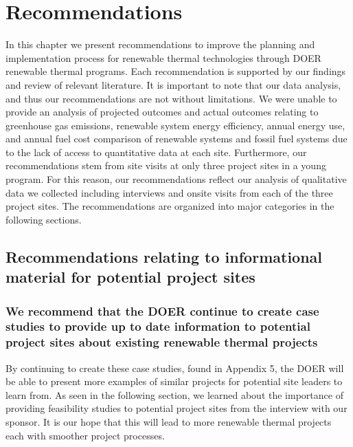 
\chapter{Recommendations}
\par In this chapter we present recommendations to improve the planning and implementation process for renewable thermal technologies through DOER renewable thermal programs. Each recommendation is supported by our findings and review of relevant literature. It is important to note that our data analysis, and thus our recommendations are not without limitations. We were unable to provide an analysis of projected outcomes and actual outcomes relating to greenhouse gas emissions, renewable system energy efficiency, annual energy use, and annual fuel cost comparison of renewable systems and fossil fuel systems due to the lack of access to quantitative data at each site. Furthermore, our recommendations stem from site visits at only three project sites in a young program. For this reason, our recommendations reflect our analysis of qualitative data we collected including interviews and onsite visits from each of the three project sites. The recommendations are organized into major categories in the following sections.

\section{Recommendations relating to informational material for potential project sites}
\subsection{We recommend that the DOER continue to create case studies to provide up to date information to potential project sites about existing renewable thermal projects}  
\par By continuing to create these case studies, found in Appendix 5, the DOER will be able to present more examples of similar projects for potential site leaders to learn from. As seen in the following section, we learned about the importance of providing feasibility studies to potential project sites from the interview with our sponsor. It is our hope that this will lead to more renewable thermal projects each with smoother project processes.

